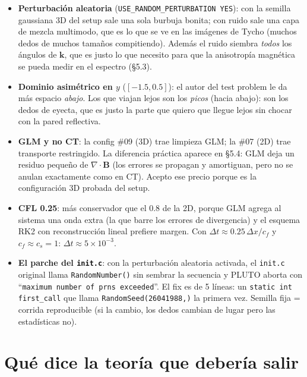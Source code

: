 \documentclass[11pt,a4paper]{article}
\begin{document}
\begin{itemize}
  \item \textbf{Perturbación aleatoria} (\texttt{USE\_RANDOM\_PERTURBATION YES}): con la
  semilla gaussiana 3D del setup sale una sola burbuja bonita; con ruido sale una capa de
  mezcla multimodo, que es lo que se ve en las imágenes de Tycho (muchos dedos de muchos
  tamaños compitiendo). Además el ruido siembra \emph{todos} los ángulos de
  $\mathbf{k}$, que es justo lo que necesito para que la anisotropía magnética se pueda
  medir en el espectro (\S5.3).
  \item \textbf{Dominio asimétrico en $y$} ($[-1.5,0.5]$): el autor del test problem le
  da más espacio \emph{abajo}. Los que
  viajan lejos son los \emph{picos} (hacia abajo): son los dedos de eyecta, que es justo
  la parte que quiero que llegue lejos sin chocar con la pared reflectiva.
  \item \textbf{GLM y no CT}: la config \#09 (3D) trae limpieza GLM; la \#07 (2D) trae
  transporte restringido. La diferencia práctica aparece en \S5.4: GLM deja un residuo
  pequeño de $\nabla\cdot\mathbf{B}$ (los errores se propagan y amortiguan, pero no se
  anulan exactamente como en CT). Acepto ese precio porque es la configuración 3D
  probada del setup.
  \item \textbf{CFL 0.25}: más conservador que el 0.8 de la 2D, porque GLM agrega al
  sistema una onda extra (la que barre los errores de divergencia) y el esquema RK2 con
  reconstrucción lineal prefiere margen. Con $\Delta t\approx0.25\,\Delta x/c_f$ y
  $c_f\approx c_s=1$: $\Delta t\approx5\times10^{-3}$.
  \item \textbf{El parche del \texttt{init.c}}: con la perturbación aleatoria activada,
  el \texttt{init.c} original llama \texttt{Random\allowbreak Number()} sin sembrar la secuencia y
  PLUTO aborta con ``\texttt{maximum number of prns exceeded}''. El fix es de 5 líneas:
  un \texttt{static int first\_call} que llama \texttt{Random\allowbreak Seed\allowbreak(26041988,)} la primera
  vez. Semilla fija = corrida reproducible (si la cambio, los dedos cambian de lugar pero
  las estadísticas no).
\end{itemize}

\section{Qué dice la teoría que debería salir}
\end{document}
